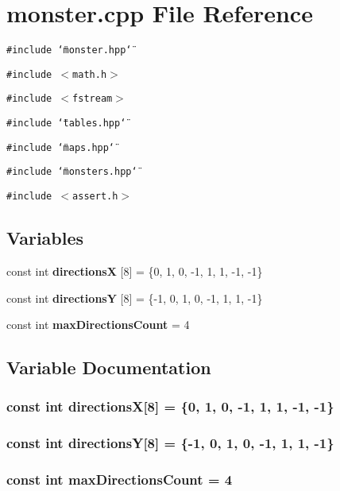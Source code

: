 \section{monster.cpp File Reference}
\label{monster_8cpp}
{\tt \#include \char`\"{}monster.hpp\char`\"{}}\par
{\tt \#include $<$math.h$>$}\par
{\tt \#include $<$fstream$>$}\par
{\tt \#include \char`\"{}tables.hpp\char`\"{}}\par
{\tt \#include \char`\"{}maps.hpp\char`\"{}}\par
{\tt \#include \char`\"{}monsters.hpp\char`\"{}}\par
{\tt \#include $<$assert.h$>$}\par
\subsection*{Variables}
\begin{CompactItemize}
\item 
const int {\bf directions\-X} [8] = \{0, 1, 0, -1, 1, 1, -1, -1\}
\item 
const int {\bf directions\-Y} [8] = \{-1, 0, 1, 0, -1, 1, 1, -1\}
\item 
const int {\bf max\-Directions\-Count} = 4
\end{CompactItemize}


\subsection{Variable Documentation}
\subsubsection{\setlength{\rightskip}{0pt plus 5cm}const int {\bf directions\-X}[8] = \{0, 1, 0, -1, 1, 1, -1, -1\}}\label{monster_8cpp_a0}


\subsubsection{\setlength{\rightskip}{0pt plus 5cm}const int {\bf directions\-Y}[8] = \{-1, 0, 1, 0, -1, 1, 1, -1\}}\label{monster_8cpp_a1}


\subsubsection{\setlength{\rightskip}{0pt plus 5cm}const int {\bf max\-Directions\-Count} = 4}\label{monster_8cpp_a2}


